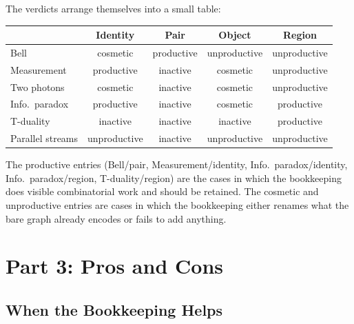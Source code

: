 \documentclass[11pt]{article}
\begin{document}
The verdicts arrange themselves into a small table:
\begin{center}
\begin{tabular}{lcccc}
                 & \textbf{Identity} & \textbf{Pair} & \textbf{Object} & \textbf{Region} \\ \hline
Bell            & cosmetic & productive & unproductive & unproductive \\
Measurement     & productive & inactive & cosmetic & unproductive \\
Two photons     & cosmetic & inactive & cosmetic & unproductive \\
Info.~paradox   & productive & inactive & cosmetic & productive \\
T-duality       & inactive & inactive & inactive & productive \\
Parallel streams & unproductive & inactive & unproductive & unproductive
\end{tabular}
\end{center}
The productive entries (Bell/pair, Measurement/identity, Info.~paradox/identity, Info.~paradox/region, T-duality/region) are the cases in which the bookkeeping does visible combinatorial work and should be retained. The cosmetic and unproductive entries are cases in which the bookkeeping either renames what the bare graph already encodes or fails to add anything.

\section{Part 3: Pros and Cons}

\label{sec:conclusion}

\subsection{When the Bookkeeping Helps}
\end{document}
